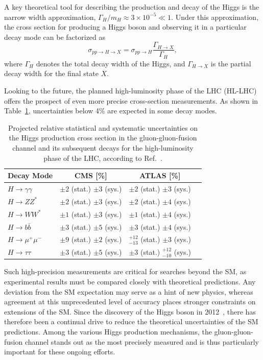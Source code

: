 A key theoretical tool for describing the production and decay of the Higgs is the narrow width approximation, $\Gamma_H / m_H \approx 3 \times 10^{-5} \ll 1$.
Under this approximation, the cross section for producing a Higgs boson and observing it in a particular decay mode can be factorized as
\begin{equation}
\sigma_{pp \rightarrow H \rightarrow X} = \sigma_{pp \rightarrow H} \frac{\Gamma_{H \rightarrow X}}{\Gamma_H},
\label{eq:4:narrow_width_approximation}
\end{equation}
where $\Gamma_H$ denotes the total decay width of the Higgs, and $\Gamma_{H \rightarrow X}$ is the partial decay width for the final state $X$.

Looking to the future, the planned high-luminosity phase of the \acs{LHC} (HL-LHC) offers the prospect of even more precise cross-section measurements.
As shown in Table~\ref{tab:4:HLLHC_projections}, uncertainties below 4\% are expected in some decay modes.

\begin{table}[ht!]
\centering
\begin{tabular}{lccc}
Decay Mode & CMS [\%] & ATLAS [\%] \\
\hline
$H \rightarrow \gamma \gamma$  & $\pm 2$ (stat.) $\pm 3$ (sys.)  & $\pm 2$ (stat.) $\pm 3$ (sys.) \\
$H \rightarrow Z Z^*$          & $\pm 2$ (stat.) $\pm 3$ (sys.)  & $\pm 2$ (stat.) $\pm 4$ (sys.) \\
$H \rightarrow W W^*$          & $\pm 1$ (stat.) $\pm 3$ (sys.)  & $\pm 1$ (stat.) $\pm 4$ (sys.) \\
$H \rightarrow b\bar{b}$       & $\pm 3$ (stat.) $\pm 5$ (sys.)  & $\pm 3$ (stat.) $\pm 4$ (sys.) \\
$H \rightarrow \mu^+ \mu^-$    & $\pm 9$ (stat.) $\pm 2$ (sys.)  & ${}^{+12}_{-13}$ (stat.) $\pm 3$ (sys.) \\
$H \rightarrow \tau \tau$      & $\pm 3$ (stat.) $\pm 5$ (sys.)  & $\pm 3$ (stat.) ${}^{+12}_{-10}$ (sys.) \\
\end{tabular}
\caption{Projected relative statistical and systematic uncertainties on the Higgs production cross section in the gluon-gluon-fusion channel and its subsequent decays for the high-luminosity phase of the \acs{LHC}, according to Ref.~\cite{Cepeda:2019klc}.}
\label{tab:4:HLLHC_projections}
\end{table}

Such high-precision measurements are critical for searches beyond the \acs{SM}, as experimental results must be compared closely with theoretical predictions.
Any deviation from the \acs{SM} expectation may serve as a hint of new physics, whereas agreement at this unprecedented level of accuracy places stronger constraints on extensions of the \acs{SM}.
Since the discovery of the Higgs boson in 2012~\cite{ATLAS:2012yve, CMS:2012qbp}, there has therefore been a continual drive to reduce the theoretical uncertainties of the \acs{SM} predictions. Among the various Higgs production mechanisms, the gluon-gluon-fusion channel stands out as the most precisely measured and is thus particularly important for these ongoing efforts.

